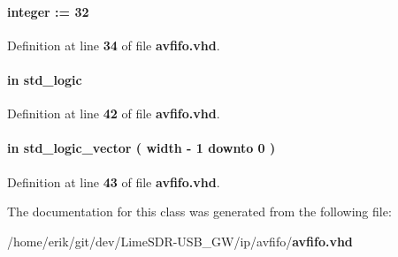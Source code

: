 \paragraph[{width}]{ {\bfseries \textcolor{vhdlchar}{ }} {\bfseries \textcolor{comment}{integer}\textcolor{vhdlchar}{ }\textcolor{vhdlchar}{ }\textcolor{vhdlchar}{\+:}\textcolor{vhdlchar}{=}\textcolor{vhdlchar}{ }\textcolor{vhdlchar}{ } \textcolor{vhdldigit}{32} \textcolor{vhdlchar}{ }} \hspace{0.3cm}{\ttfamily [Generic]}}\label{classavfifo_a64b3cab9fa613671741af6b240ff64df}


Definition at line {\bf 34} of file {\bf avfifo.\+vhd}.

\paragraph[{write}]{ {\bfseries \textcolor{keywordflow}{in}\textcolor{vhdlchar}{ }} {\bfseries \textcolor{comment}{std\+\_\+logic}\textcolor{vhdlchar}{ }} \hspace{0.3cm}{\ttfamily [Port]}}\label{classavfifo_aa8affe4a2fd2857b245f27ae049bf478}


Definition at line {\bf 42} of file {\bf avfifo.\+vhd}.

\paragraph[{writedata}]{ {\bfseries \textcolor{keywordflow}{in}\textcolor{vhdlchar}{ }} {\bfseries \textcolor{comment}{std\+\_\+logic\+\_\+vector}\textcolor{vhdlchar}{ }\textcolor{vhdlchar}{(}\textcolor{vhdlchar}{ }\textcolor{vhdlchar}{ }\textcolor{vhdlchar}{ }\textcolor{vhdlchar}{ }{\bfseries {\bf width}} \textcolor{vhdlchar}{-\/}\textcolor{vhdlchar}{ } \textcolor{vhdldigit}{1} \textcolor{vhdlchar}{ }\textcolor{keywordflow}{downto}\textcolor{vhdlchar}{ }\textcolor{vhdlchar}{ } \textcolor{vhdldigit}{0} \textcolor{vhdlchar}{ }\textcolor{vhdlchar}{)}\textcolor{vhdlchar}{ }} \hspace{0.3cm}{\ttfamily [Port]}}\label{classavfifo_a8760184c9851b5e50788447ce841ce57}


Definition at line {\bf 43} of file {\bf avfifo.\+vhd}.



The documentation for this class was generated from the following file\+:\begin{DoxyCompactItemize}
\item 
/home/erik/git/dev/\+Lime\+S\+D\+R-\/\+U\+S\+B\+\_\+\+G\+W/ip/avfifo/{\bf avfifo.\+vhd}\end{DoxyCompactItemize}
